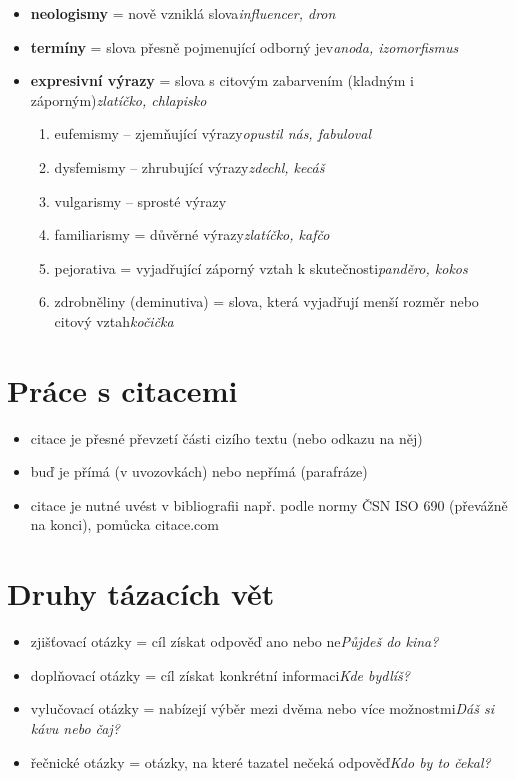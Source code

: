 \documentclass{memoir}
\begin{document}
\begin{itemize}
		\item \textbf{neologismy} = nově vzniklá slova\hfill\textit{influencer, dron}
		\item \textbf{termíny} = slova přesně pojmenující odborný jev\hfill\textit{anoda, izomorfismus}
		\item \textbf{expresivní výrazy} = slova s citovým zabarvením (kladným i záporným)\hfill\textit{zlatíčko, chlapisko}
		\begin{enumerate}
			\item eufemismy -- zjemňující výrazy\hfill\textit{opustil nás, fabuloval}
			\item dysfemismy -- zhrubující výrazy\hfill\textit{zdechl, kecáš}
			\item vulgarismy -- sprosté výrazy
			\item familiarismy = důvěrné výrazy\hfill\textit{zlatíčko, kafčo}
			\item pejorativa = vyjadřující záporný vztah k skutečnosti\hfill\textit{panděro, kokos}
			\item zdrobněliny (deminutiva) = slova, která vyjadřují menší rozměr nebo citový vztah\hfill\textit{kočička}
		\end{enumerate}
	\end{itemize}

\section*{Práce s citacemi}
	\begin{itemize}
		\item citace je přesné převzetí části cizího textu (nebo odkazu na něj)
		\item buď je přímá (v uvozovkách) nebo nepřímá (parafráze)
		\item citace je nutné uvést v bibliografii např. podle normy ČSN ISO 690 (převážně na konci), pomůcka citace.com
	\end{itemize}

\section*{Druhy tázacích vět}
	\begin{itemize}
		\item zjišťovací otázky = cíl získat odpověď ano nebo ne\hfill\textit{Půjdeš do kina?}
		\item doplňovací otázky = cíl získat konkrétní informaci\hfill\textit{Kde bydlíš?}
		\item vylučovací otázky = nabízejí výběr mezi dvěma nebo více možnostmi\hfill\textit{Dáš si kávu nebo čaj?}
		\item řečnické otázky = otázky, na které tazatel nečeká odpověď\hfill\textit{Kdo by to čekal?}
	\end{itemize}
\end{document}
